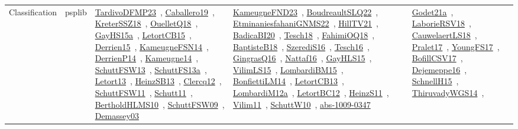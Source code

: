 {\begin{longtable}{lp{3cm}>{\raggedright\arraybackslash}p{6cm}>{\raggedright\arraybackslash}p{6cm}>{\raggedright\arraybackslash}p{8cm}}
Classification & psplib & \href{works/TardivoDFMP23.pdf}{TardivoDFMP23}~\cite{TardivoDFMP23}, \href{works/Caballero19.pdf}{Caballero19}~\cite{Caballero19}, \href{works/KreterSSZ18.pdf}{KreterSSZ18}~\cite{KreterSSZ18}, \href{works/OuelletQ18.pdf}{OuelletQ18}~\cite{OuelletQ18}, \href{works/GayHS15a.pdf}{GayHS15a}~\cite{GayHS15a}, \href{works/LetortCB15.pdf}{LetortCB15}~\cite{LetortCB15}, \href{works/Derrien15.pdf}{Derrien15}~\cite{Derrien15}, \href{works/KameugneFSN14.pdf}{KameugneFSN14}~\cite{KameugneFSN14}, \href{works/DerrienP14.pdf}{DerrienP14}~\cite{DerrienP14}, \href{works/Kameugne14.pdf}{Kameugne14}~\cite{Kameugne14}, \href{works/SchuttFSW13.pdf}{SchuttFSW13}~\cite{SchuttFSW13}, \href{works/SchuttFS13a.pdf}{SchuttFS13a}~\cite{SchuttFS13a}, \href{works/Letort13.pdf}{Letort13}~\cite{Letort13}, \href{works/HeinzSB13.pdf}{HeinzSB13}~\cite{HeinzSB13}, \href{works/Clercq12.pdf}{Clercq12}~\cite{Clercq12}, \href{works/SchuttFSW11.pdf}{SchuttFSW11}~\cite{SchuttFSW11}, \href{works/Schutt11.pdf}{Schutt11}~\cite{Schutt11}, \href{works/BertholdHLMS10.pdf}{BertholdHLMS10}~\cite{BertholdHLMS10}, \href{works/SchuttFSW09.pdf}{SchuttFSW09}~\cite{SchuttFSW09}, \href{works/Demassey03.pdf}{Demassey03}~\cite{Demassey03} & \href{works/KameugneFND23.pdf}{KameugneFND23}~\cite{KameugneFND23}, \href{works/BoudreaultSLQ22.pdf}{BoudreaultSLQ22}~\cite{BoudreaultSLQ22}, \href{works/EtminaniesfahaniGNMS22.pdf}{EtminaniesfahaniGNMS22}~\cite{EtminaniesfahaniGNMS22}, \href{works/HillTV21.pdf}{HillTV21}~\cite{HillTV21}, \href{works/BadicaBI20.pdf}{BadicaBI20}~\cite{BadicaBI20}, \href{works/Tesch18.pdf}{Tesch18}~\cite{Tesch18}, \href{works/FahimiOQ18.pdf}{FahimiOQ18}~\cite{FahimiOQ18}, \href{works/BaptisteB18.pdf}{BaptisteB18}~\cite{BaptisteB18}, \href{works/SzerediS16.pdf}{SzerediS16}~\cite{SzerediS16}, \href{works/Tesch16.pdf}{Tesch16}~\cite{Tesch16}, \href{works/GingrasQ16.pdf}{GingrasQ16}~\cite{GingrasQ16}, \href{works/Nattaf16.pdf}{Nattaf16}~\cite{Nattaf16}, \href{works/GayHLS15.pdf}{GayHLS15}~\cite{GayHLS15}, \href{works/VilimLS15.pdf}{VilimLS15}~\cite{VilimLS15}, \href{works/LombardiBM15.pdf}{LombardiBM15}~\cite{LombardiBM15}, \href{works/BonfiettiLM14.pdf}{BonfiettiLM14}~\cite{BonfiettiLM14}, \href{works/LetortCB13.pdf}{LetortCB13}~\cite{LetortCB13}, \href{works/LombardiM12a.pdf}{LombardiM12a}~\cite{LombardiM12a}, \href{works/LetortBC12.pdf}{LetortBC12}~\cite{LetortBC12}, \href{works/HeinzS11.pdf}{HeinzS11}~\cite{HeinzS11}, \href{works/Vilim11.pdf}{Vilim11}~\cite{Vilim11}, \href{works/SchuttW10.pdf}{SchuttW10}~\cite{SchuttW10}, \href{works/abs-1009-0347.pdf}{abs-1009-0347}~\cite{abs-1009-0347} & \href{works/Godet21a.pdf}{Godet21a}~\cite{Godet21a}, \href{works/LaborieRSV18.pdf}{LaborieRSV18}~\cite{LaborieRSV18}, \href{works/CauwelaertLS18.pdf}{CauwelaertLS18}~\cite{CauwelaertLS18}, \href{works/Pralet17.pdf}{Pralet17}~\cite{Pralet17}, \href{works/YoungFS17.pdf}{YoungFS17}~\cite{YoungFS17}, \href{works/BofillCSV17.pdf}{BofillCSV17}~\cite{BofillCSV17}, \href{works/Dejemeppe16.pdf}{Dejemeppe16}~\cite{Dejemeppe16}, \href{works/SchnellH15.pdf}{SchnellH15}~\cite{SchnellH15}, \href{works/ThiruvadyWGS14.pdf}{ThiruvadyWGS14}~\cite{ThiruvadyWGS14}, 
\end{longtable}}
